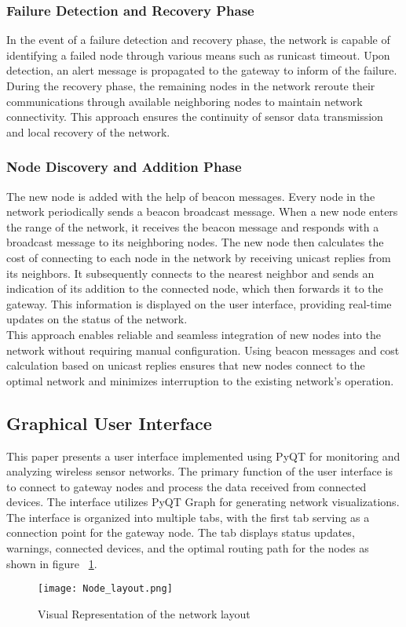 \documentclass[conference]{IEEEtran}
\begin{document}
\subsubsection{Failure Detection and Recovery Phase}\label{AA}
In the event of a failure detection and recovery phase, the network is capable of identifying a failed node through various means such as runicast timeout. Upon detection, an alert message is propagated to the gateway to inform of the failure. During the recovery phase, the remaining nodes in the network reroute their communications through available neighboring nodes to maintain network connectivity. This approach ensures the continuity of sensor data transmission and local recovery of the network.


\subsubsection{Node Discovery and Addition Phase}\label{AA}
The new node is added with the help of beacon messages. Every node in the network periodically sends a beacon broadcast message. When a new node enters the range of the network, it receives the beacon message and responds with a broadcast message to its neighboring nodes. The new node then calculates the cost of connecting to each node in the network by receiving unicast replies from its neighbors. It subsequently connects to the nearest neighbor and sends an indication of its addition to the connected node, which then forwards it to the gateway. This information is displayed on the user interface, providing real-time updates on the status of the network.\\
This approach enables reliable and seamless integration of new nodes into the network without requiring manual configuration. Using beacon messages and cost calculation based on unicast replies ensures that new nodes connect to the optimal network and minimizes interruption to the existing network's operation. 

\subsection{Graphical User Interface}\label{AA}
This paper presents a user interface implemented using PyQT for monitoring and analyzing wireless sensor networks. The primary function of the user interface is to connect to gateway nodes and process the data received from connected devices. The interface utilizes PyQT Graph for generating network visualizations.
The interface is organized into multiple tabs, with the first tab serving as a connection point for the gateway node. The tab displays status updates, warnings, connected devices, and the optimal routing path for the nodes as shown in figure ~\ref{fig:Visual Representation of the network layout}.\\
\begin{figure}
  \texttt{[image: Node\_layout.png]}
  \caption{Visual Representation of the network layout}
  \label{fig:Visual Representation of the network layout}
\end{figure}
\end{document}
